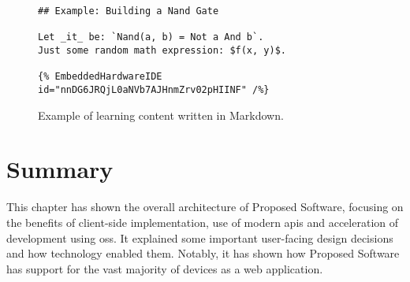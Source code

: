 \begin{figure}[H]
\begin{verbatim}
## Example: Building a Nand Gate

Let _it_ be: `Nand(a, b) = Not a And b`.
Just some random math expression: $f(x, y)$.

{% EmbeddedHardwareIDE id="nnDG6JRQjL0aNVb7AJHnmZrv02pHIINF" /%}
\end{verbatim}
    \caption{Example of learning content written in Markdown.}
    \label{fig:design-markdown-example}
\end{figure}

\section{Summary}

This chapter has shown the overall architecture of Proposed Software, focusing on the benefits of client-side implementation, use of modern \glspl{api} and acceleration of development using \gls{oss}.
It explained some important user-facing design decisions and how technology enabled them.
Notably, it has shown how Proposed Software has support for the vast majority of devices as a web application.
